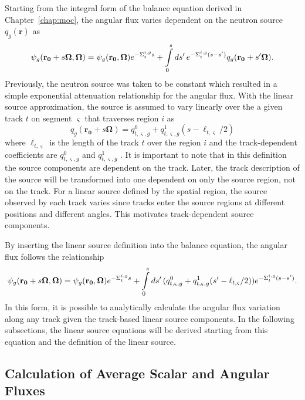 Starting from the integral form of the balance equation derived in Chapter~\ref{chap:moc}, the angular flux varies dependent on the neutron source $q_g(\mathbf{r})$ as
\begin{dmath*}
	\psi_g(\mathbf{r_0} + s \mathbf{\Omega},\mathbf{\Omega}) = \psi_g(\mathbf{r_0},\mathbf{\Omega}) e^{-\Sigma_{t}^{i,g} s} + \int\displaylimits_{0}^{s} ds' \, e^{-\Sigma_{t}^{i,g} (s-s')}q_g(\mathbf{r_0} + s'\mathbf{\Omega}).
\end{dmath*}
Previously, the neutron source was taken to be constant which resulted in a simple exponential attenuation relationship for the angular flux. With the linear source approximation, the source is assumed to vary linearly over the a given track $t$ on segment $\varsigma$ that traverses region $i$ as
\begin{equation}
q_g(\mathbf{r_0} + s\mathbf{\Omega}) = q^0_{t,\varsigma,g} + q^1_{t,\varsigma,g}(s-\ell_{t,\varsigma}/2)
\label{eq:track-ls}
\end{equation}
where $\ell_{t,\varsigma}$ is the length of the track $t$ over the region $i$ and the track-dependent coefficients are $q^0_{t,\varsigma,g}$ and $q^1_{t,\varsigma,g}$ . It is important to note that in this definition the source components are dependent on the track. Later, the track description of the source will be transformed into one dependent on only the source region, not on the track. For a linear source defined by the spatial region, the source observed by each track varies since tracks enter the source regions at different positions and different angles. This motivates track-dependent source components. 

By inserting the linear source definition into the balance equation, the angular flux follows the relationship
\begin{equation}
\psi_g(\mathbf{r_0} + s \mathbf{\Omega},\mathbf{\Omega}) = \psi_g(\mathbf{r_0},\mathbf{\Omega}) e^{-\Sigma_{t}^{i,g} s} + \int\displaylimits_{0}^{s} ds' \, (q^0_{t,\varsigma,g} + q^1_{t,\varsigma,g}(s'-\ell_{t,\varsigma}/2)) e^{-\Sigma_{t}^{i,g} (s-s')}.
\label{eq:first-ls}
\end{equation}
In this form, it is possible to analytically calculate the angular flux variation along any track given the track-based linear source components. In the following subsections, the linear source equations will be derived starting from this equation and the definition of the linear source.

\subsection{Calculation of Average Scalar and Angular Fluxes}

